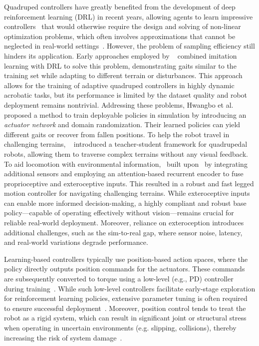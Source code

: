 Quadruped controllers have greatly benefited from the development of deep reinforcement learning (DRL) in recent years, allowing agents to learn impressive controllers~\cite{hu2019learning, bellegarda2022robust, bellegarda2024robust, ren2021learning} that would otherwise require the design and solving of non-linear optimization problems, which often involves approximations that cannot be neglected in real-world settings~\cite{ding2019real, kim2019highly, neunert2018whole, grandia2023perceptive}.
However, the problem of sampling efficiency still hinders its application.
Early approaches employed by ~\citet{peng2018deepmimic} combined imitation learning with DRL to solve this problem, demonstrating gaits similar to the training set while adapting to different terrain or disturbances.
This approach allows for the training of adaptive quadruped controllers in highly dynamic acrobatic tasks, but its performance is limited by the dataset quality and robot deployment remains nontrivial.
Addressing these problems, Hwangbo et al. ~\cite{hwangbo2019learning} proposed a method to train deployable policies in simulation by introducing an \textit{actuator network} and domain randomization.
Their learned policies can yield different gaits or recover from fallen positions.
To help the robot travel in challenging terrains, ~\citet{lee2020learning} introduced a teacher-student framework for quadrupedal robots, allowing them to traverse complex terrains without any visual feedback.
To aid locomotion with environmental information,~\cite{miki2022learning} built upon~\cite{lee2020learning} by integrating additional sensors and employing an attention-based recurrent encoder to fuse proprioceptive and exteroceptive inputs. This resulted in a robust and fast legged motion controller for navigating challenging terrains.
While exteroceptive inputs can enable more informed decision-making, a highly compliant and robust base policy—capable of operating effectively without vision—remains crucial for reliable real-world deployment. Moreover, reliance on exteroception introduces additional challenges, such as the sim-to-real gap, where sensor noise, latency, and real-world variations degrade performance. 

Learning-based controllers typically use position-based action spaces, where the policy directly outputs position commands for the actuators.
These commands are subsequently converted to torque using a low-level (e.g., PD)  controller during training~\cite{aractingi2023controlling, yang2020data, allshire2021laser}.
While such low-level controllers facilitate early-stage exploration for reinforcement learning policies, extensive parameter tuning is often required to ensure successful deployment~\cite{kim2023automated, lyu2024rl2ac}.
Moreover, position control tends to treat the robot as a rigid system, which can result in significant joint or structural stress when operating in uncertain environments (e.g. slipping, collisions), thereby increasing the risk of system damage~\cite{buchli2009compliant}. 

